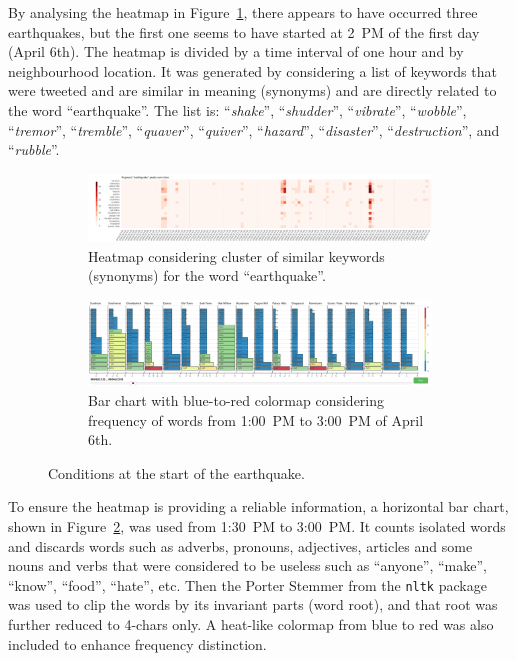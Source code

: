 By analysing the heatmap in Figure~\ref{fig:eq_start_heat}, there appears to
have occurred three earthquakes, but the first one seems to have started at 2~PM
of the first day (April 6th). The heatmap is divided by a time interval of one
hour and by neighbourhood location. It was generated by considering a list of
keywords that were tweeted and are similar in meaning (synonyms) and are
directly related to the word ``earthquake''. The list is: 
``\emph{shake}'', ``\emph{shudder}'', ``\emph{vibrate}'', ``\emph{wobble}'',
``\emph{tremor}'', ``\emph{tremble}'', ``\emph{quaver}'', ``\emph{quiver}'',
``\emph{hazard}'', ``\emph{disaster}'', ``\emph{destruction}'', and
``\emph{rubble}''.

\begin{figure}[!h]
    \centering
    \begin{subfigure}[!h]{0.95\textwidth}
        \centering
        \includegraphics[width=1.00\textwidth]{figs/q1/eq_start_heat.png}
        \caption{Heatmap considering cluster of similar keywords (synonyms) for
        the word ``earthquake''.}
        \label{fig:eq_start_heat}
    \vspace{12pt}
    \end{subfigure}
    \begin{subfigure}[!h]{0.95\textwidth}
        \centering
        \includegraphics[width=1.00\textwidth]{figs/q1/eq_start_hbar.png}
        \caption{Bar chart with blue-to-red colormap considering frequency of
        words from 1:00~PM to 3:00~PM of April 6th.}
        \label{fig:eq_start_hbar}
    \end{subfigure}
    \caption{Conditions at the start of the earthquake.}
    \label{fig:eq_start}
\end{figure}

To ensure the heatmap is providing a reliable information, a horizontal bar
chart, shown in Figure~\ref{fig:eq_start_hbar}, was used from 1:30~PM to 
3:00~PM. It counts isolated words and discards words such as adverbs, pronouns,
adjectives, articles and some nouns and verbs that were considered to be useless
such as ``anyone'', ``make'', ``know'', ``food'', ``hate'', etc. Then the Porter
Stemmer from the \texttt{nltk} package was used to clip the words by its
invariant parts (word root), and that root was further reduced to 4-chars only.
A heat-like colormap from blue to red was also included to enhance frequency
distinction. 

